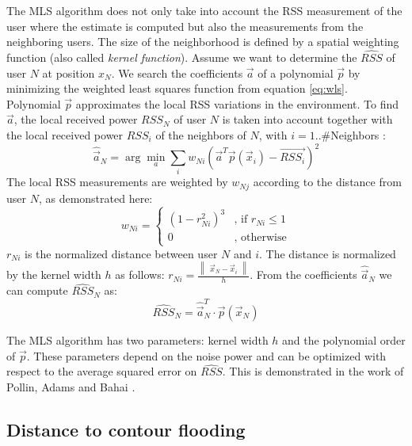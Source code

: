 The MLS algorithm does not only take into account the RSS measurement of the user where the estimate is computed but also the measurements from the neighboring users. The size of the neighborhood is defined by a spatial weighting function (also called \textit{kernel function}). Assume we want to determine the $\hat{RSS}$ of user $N$ at position $x_N$. We search the coefficients $\vec{a}$ of a polynomial $\vec{p}$ by minimizing the weighted least squares function from equation \ref{eq:wls}. Polynomial $\vec{p}$ approximates the local RSS variations in the environment. To find $\vec{a}$, the local received power $RSS_N$ of user $N$ is taken into account together with the local received power $RSS_i$ of the neighbors of $N$, with $i=1..\#$Neighbors :
\begin{equation} \label{eq:wls}
\hat{\vec{a}}_N = \arg \min_a \sum_i w_{Ni}(\vec{a}^T \vec{p}(\vec{x}_i)-\vec{RSS_i})^2 \nonumber
\end{equation}
The local RSS measurements are weighted by $w_{Nj}$ according to the distance from user $N$, as demonstrated here:
\begin{equation} \label{eq:wij}
w_{Ni} = \begin{cases} 
(1-r_{Ni}^2)^3 &  \text{, if $r_{Ni} \leq 1$} \nonumber \\ 
0 & \text{, otherwise}
\end{cases}
\end{equation}
$r_{Ni}$ is the normalized distance between user $N$ and $i$. The distance is normalized by the kernel width $h$ as follows: $r_{Ni}=\frac{\begin{Vmatrix}\vec{x}_N-\vec{x}_i\end{Vmatrix}}{h}$.
From the coefficients $\hat{\vec{a}}_N$ we can compute $\hat{RSS}_N$ as:
\begin{equation}
\hat{RSS}_N = \hat{\vec{a}}^T_N \cdot \vec{p}(\vec{x}_N) \nonumber
\end{equation}

The MLS algorithm has two parameters: kernel width $h$ and the polynomial order of $\vec{p}$. These parameters depend on the noise power and can be optimized with respect to the average squared error on $\hat{RSS}$. This is demonstrated in the work of Pollin, Adams and Bahai \cite{sofie}. 

\subsection{Distance to contour flooding} \label{sec:dtc1}

